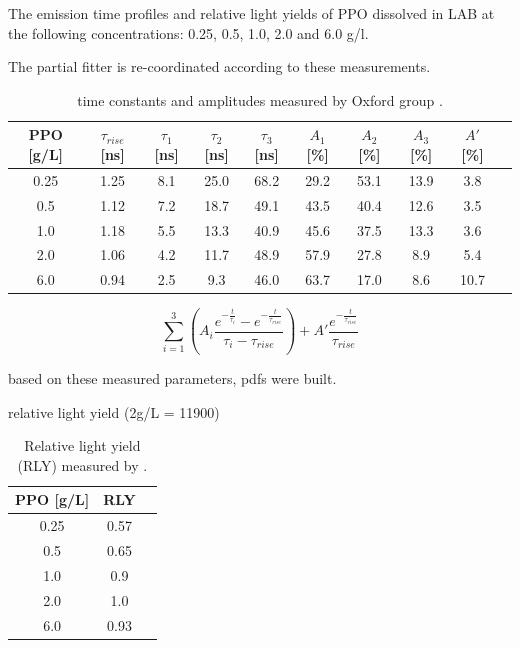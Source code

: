 The emission time profiles and relative light yields of PPO dissolved in LAB at the following concentrations: 0.25, 0.5, 1.0, 2.0 and 6.0 g/l.

The partial fitter is re-coordinated according to these measurements.

\begin{table}[ht]
	\centering
	\caption{\label{oxfordMeasure} time constants and amplitudes measured by Oxford group \cite{oxfordMeasurement}.}	
	{\centering
		\begin{tabular*}{160mm}{c@{\extracolsep{\fill}}ccccccccc}
			\toprule 
			PPO [g/L] & $\tau_{rise}$ [ns] & $\tau_1$ [ns] & $\tau_2$ [ns] & $\tau_3$ [ns] & $A_1$ [\%]  & $A_2$ [\%]   & $A_3$ [\%]  & $A'$ [\%] \\
			\midrule
			0.25 & 1.25 & 8.1 & 25.0 & 68.2 & 29.2 & 53.1 & 13.9 & 3.8\\
			0.5  & 1.12 & 7.2 & 18.7 & 49.1 & 43.5 & 40.4 & 12.6 & 3.5 \\
			1.0 & 1.18 & 5.5 & 13.3 & 40.9 &	45.6 & 37.5 & 13.3 & 3.6 \\
			2.0 & 1.06 & 4.2 & 11.7 & 48.9 & 57.9 & 27.8 & 8.9 & 5.4	\\
			6.0 & 0.94 & 2.5 & 9.3  & 46.0 & 63.7 & 17.0 & 8.6 & 10.7\\
			\bottomrule	
		\end{tabular*}
	}
\end{table}


\[
\sum_{i=1}^3 (A_i\frac{e^{-\frac{t}{\tau_i}}-e^{-\frac{t}{\tau_{rise}}}}{\tau_i-\tau_{rise}})+A'\frac{e^{-\frac{t}{\tau_{rise}}}}{\tau_{rise}}
\]

based on these measured parameters, pdfs were built. 


relative light yield (2g/L = 11900)
\begin{table}[ht]
	\centering
	\caption{\label{oxfordMeasure2}Relative light yield (RLY) measured by \cite{oxfordMeasurement}.}	
	{\centering
		\begin{tabular*}{60mm}{c@{\extracolsep{\fill}}cc}
			\toprule 
			PPO [g/L] & RLY \\
			\midrule
			0.25 & 0.57\\
			0.5 & 0.65\\
			1.0 & 0.9\\
			2.0 & 1.0\\
			6.0 & 0.93\\
			\bottomrule	
		\end{tabular*}
	}
\end{table}

